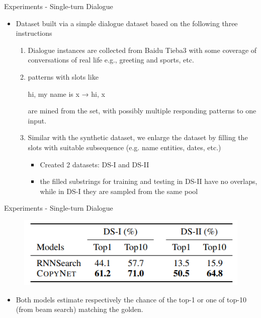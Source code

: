 \documentclass{beamer}
\begin{document}
\begin{frame}{Experiments - Single-turn Dialogue}
    \begin{itemize}
        \item {Dataset built via a simple dialogue dataset
based on the following three instructions}
        \begin{enumerate}
            \item {Dialogue instances are collected from Baidu
            Tieba3 with some coverage of conversations
            of real life e.g., greeting and sports, etc.}
            \item {patterns with slots like \begin{center}
                hi, my name is x → hi, x
            \end{center}
            are mined from the set, with possibly multiple
            responding patterns to one input.}
            \item {Similar with the synthetic dataset, we enlarge
            the dataset by filling the slots with suitable
            subsequence (e.g. name entities, dates, etc.)}
        \begin{itemize}
            \item Created 2 datasets: DS-I and DS-II
            \item the filled substrings for training and
        testing in DS-II have no overlaps, while in DS-I
        they are sampled from the same pool
        \end{itemize}
        \end{enumerate}
    \end{itemize}
\end{frame}

\begin{frame}{Experiments - Single-turn Dialogue}
    \begin{figure}
        \centering
        \includegraphics{dia_results.PNG}
    \end{figure}
    \begin{itemize}
        \item Both models estimate respectively
the chance of the top-1 or one of top-10 (from
beam search) matching the golden.
    \end{itemize}
\end{frame}
\end{document}
